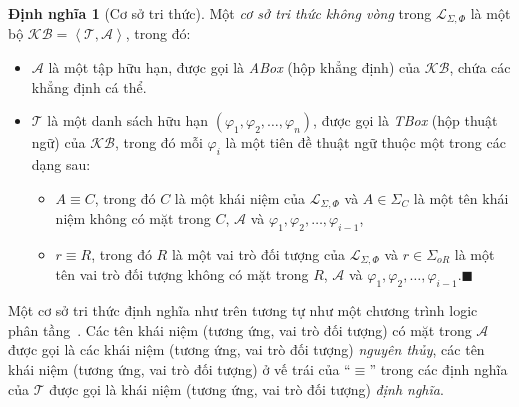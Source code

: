 \documentclass[12pt,a4paper,twoside]{report}
\newcommand{\mL}		{\mathcal{L}}
\newcommand{\mA}		{\mathcal{A}}
\newcommand{\mT}		{\mathcal{T}}
\newcommand{\SigmaC}	{\Sigma_C}
\newcommand{\SigmaOR}	{\Sigma_{oR}}
\newcommand{\KB}		{\mathcal{KB}}
\newcommand{\mLSP}		{\mL_{\Sigma,\Phi}}
\newcommand{\myend}		{\mbox{}\hfill\mbox{{\scriptsize$\!\blacksquare$}}}
\newcommand{\tuple}[1]	{\left\langle#1\right\rangle\!}
\theoremstyle{definition}
\newtheorem{Definition}{Định nghĩa}[chapter]
\begin{document}
\begin{Definition}[Cơ sở tri thức]
Một {\em cơ sở tri thức không vòng} trong $\mLSP$ là một bộ $\KB = \tuple{\mT,\mA}$, trong đó:
\begin{itemize}
\item $\mA$ là một tập hữu hạn, được gọi là {\em ABox} (hộp khẳng định) của $\KB$, chứa các khẳng định cá thể.

\item $\mT$ là một danh sách hữu hạn $(\varphi_1, \varphi_2, \ldots, \varphi_n)$, được gọi là {\em TBox} (hộp thuật ngữ) của $\KB$, trong đó mỗi $\varphi_i$ là một tiên đề thuật ngữ thuộc một trong các dạng sau:
\begin{itemize}
  \item $A \equiv C$, trong đó $C$ là một khái niệm của $\mLSP$ và $A \in \SigmaC$ là một tên khái niệm không có mặt trong $C$, $\mA$ và $\varphi_1, \varphi_2, \ldots, \varphi_{i-1}$, 
  \item $r \equiv R$, trong đó $R$ là một vai trò đối tượng của $\mLSP$ và $r \in \SigmaOR$ là một tên vai trò đối tượng không có mặt trong $R$, $\mA$ và $\varphi_1, \varphi_2, \ldots, \varphi_{i-1}$.\myend
\end{itemize} 
\end{itemize}
\end{Definition}

Một cơ sở tri thức định nghĩa như trên tương tự như một chương trình logic phân tầng~\cite{Serge1995}. Các tên khái niệm (tương ứng, vai trò đối tượng) có mặt trong $\mA$ được gọi là các khái niệm (tương ứng, vai trò đối tượng) {\em nguyên thủy}, các tên khái niệm (tương ứng, vai trò đối tượng) ở vế trái của ``$\equiv$'' trong các định nghĩa của $\mT$ được gọi là khái niệm (tương ứng, vai trò đối tượng) {\em định nghĩa}.
\end{document}
